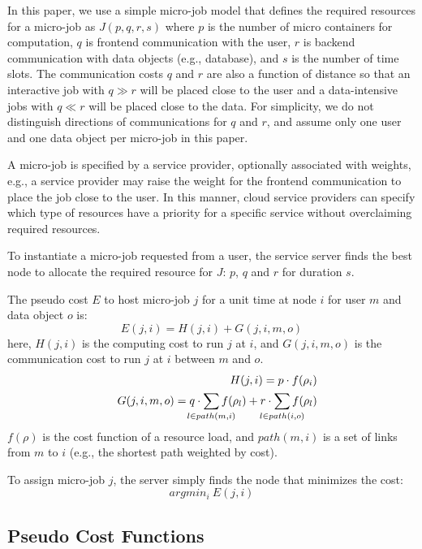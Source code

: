 In this paper, we use a simple micro-job model that defines the
required resources for a micro-job as $J(p, q, r, s)$ where 
$p$ is the number of micro containers for computation, 
$q$ is frontend communication with the user, 
$r$ is backend communication with data objects (e.g., database), and
$s$ is the number of time slots.
The communication costs $q$ and $r$ are also a function of distance so
that an interactive job with $q \gg r$ will be placed close to the
user and a data-intensive jobs with $q \ll r$ will be placed close to
the data.
For simplicity, we do not distinguish directions of
communications for $q$ and $r$, and assume only one user and one data
object per micro-job in this paper.

A micro-job is specified by a service provider, optionally associated with
weights, e.g., a service provider may raise the weight for the
frontend communication to place the job close to the user.
In this manner, cloud service providers can specify which
type of resources have a priority for a specific service without
overclaiming required resources.

To instantiate a micro-job requested from a user, the service
server finds the best node to allocate the required resource
for $J$: $p$, $q$ and $r$ for duration $s$.

The pseudo cost $E$ to host micro-job $j$ for a unit time at node $i$ for
user $m$ and data object $o$ is:
\begin{equation*}
	E(j, i)     = H(j,i) + G(j,i,m,o)
\end{equation*}
here, $H(j, i)$ is the computing cost to run $j$ at $i$, and
$G(j, i, m, o)$ is the communication cost to run $j$ at $i$
between $m$ and $o$.
\begin{eqnarray*}
&&  H(j,i)      = p \cdot f(\rho_{i}) \\
&&  G(j,i,m,o)  = q \cdot \smashoperator{\sum_{l \in path(m,i)}} f(\rho_{l}) + r \cdot \smashoperator{\sum_{l \in path(i,o)}} f(\rho_{l})
\end{eqnarray*}
$f(\rho)$ is the cost function of a resource load, and $path(m,i)$ is a set
of links from $m$ to $i$ (e.g., the shortest path weighted by cost).

To assign micro-job $j$, the server simply finds the node that minimizes the
cost:
\begin{equation*}
	argmin_{i} \: E(j, i)
\end{equation*}

\subsection{Pseudo Cost Functions}

